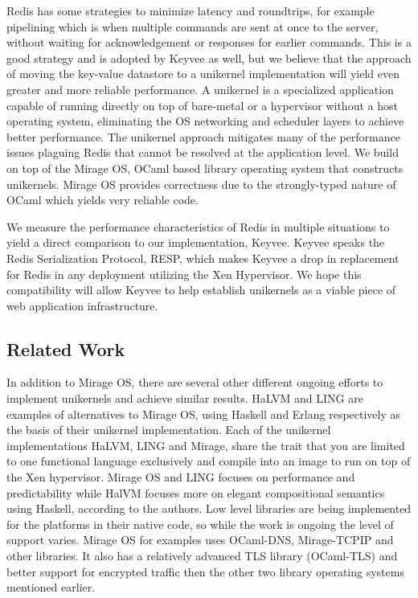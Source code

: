 \documentclass[english,10pt,twocolumn]{article}
\begin{document}
Redis has some strategies to minimize latency and roundtrips, for example pipelining which is when multiple commands are sent at once to the server, without waiting for acknowledgement or responses for earlier commands.
This is a good strategy and is adopted by Keyvee as well, but we believe that the approach of moving the key-value datastore to a unikernel implementation will yield even greater and more reliable performance.
A unikernel is a specialized application capable of running directly on top of bare-metal or a hypervisor without a host operating system, eliminating the OS networking and scheduler layers to achieve better performance.
The unikernel approach mitigates many of the performance issues plaguing Redis that cannot be resolved at the application level.
We build on top of the Mirage OS\cite{mirage}, OCaml based library operating system that constructs unikernels.
Mirage OS provides correctness due to the strongly-typed nature of OCaml which yields very reliable code.

We measure the performance characteristics of Redis in multiple situations to yield a direct comparison to our implementation, Keyvee.
Keyvee speaks the Redis Serialization Protocol\cite{redis-protocol}, RESP, which makes Keyvee a drop in replacement for Redis in any deployment utilizing the Xen Hypervisor.
We hope this compatibility will allow Keyvee to help establish unikernels as a viable piece of web application infrastructure.

\subsection{Related Work}

In addition to Mirage OS, there are several other different ongoing efforts to implement unikernels and achieve similar results.
HaLVM\cite{halvm} and LING\cite{ling} are examples of alternatives to Mirage OS, using Haskell and Erlang respectively as the basis of their unikernel implementation.
Each of the unikernel implementations HaLVM, LING and Mirage, share the trait that you are limited to one functional language exclusively and compile into an image to run on top of the Xen hypervisor.
Mirage OS and LING focuses on performance and predictability while HalVM focuses more on elegant compositional semantics using Haskell, according to the authors\cite{tripreport}.
Low level libraries are being implemented for the platforms in their native code, so while the work is ongoing the level of support varies.
Mirage OS for examples uses OCaml-DNS, Mirage-TCPIP and other libraries. It also has a relatively advanced TLS library (OCaml-TLS) and better support for encrypted traffic then the other two library operating systems mentioned earlier.
\end{document}
